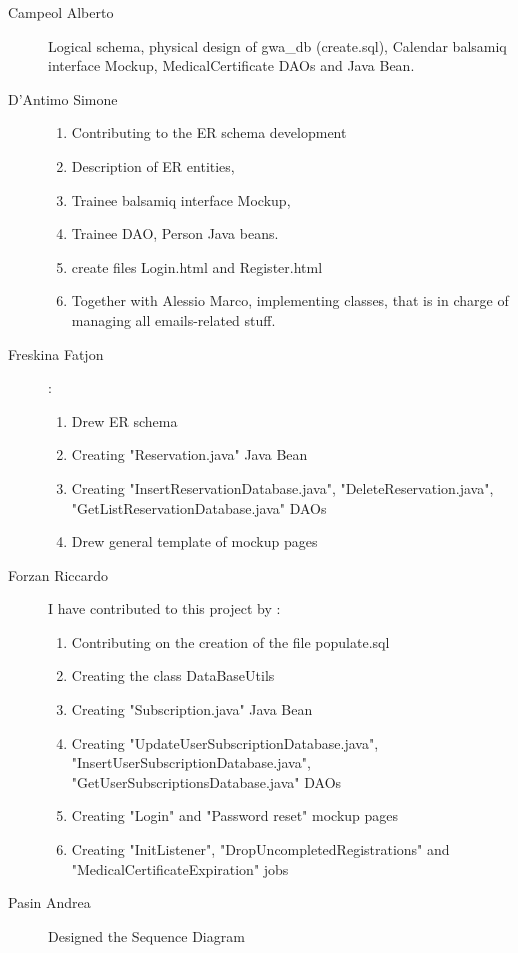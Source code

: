 \begin{description}
	\item[Campeol Alberto] Logical schema, physical design of gwa\_db (create.sql), Calendar balsamiq interface Mockup, MedicalCertificate DAOs and Java Bean.
	\item[D'Antimo Simone] 
	\begin{enumerate}
		\item Contributing to the ER schema development
		\item Description of ER entities,
		\item Trainee balsamiq interface Mockup,
		\item Trainee DAO, Person Java beans.
		\item create files Login.html and Register.html  
		\item Together with Alessio Marco, implementing classes, that is in charge of managing all emails-related stuff.
	\end{enumerate}
	\item[Freskina Fatjon] :
	\begin{enumerate}
		\item Drew ER schema 
		\item Creating "Reservation.java" Java Bean 
		\item Creating "InsertReservationDatabase.java", "DeleteReservation.java", "GetListReservationDatabase.java" DAOs
		\item Drew general template of mockup pages 
	\end{enumerate} 
	
	\item[Forzan Riccardo] I have contributed to this project by :
	\begin{enumerate}
		\item Contributing on the creation of the file populate.sql
		\item Creating the class DataBaseUtils
		\item Creating "Subscription.java" Java Bean
		\item Creating "UpdateUserSubscriptionDatabase.java", "InsertUserSubscriptionDatabase.java", "GetUserSubscriptionsDatabase.java" DAOs
		\item Creating "Login" and "Password reset" mockup pages
		\item Creating "InitListener", "DropUncompletedRegistrations" and "MedicalCertificateExpiration" jobs
	\end{enumerate}
	
	\item[Pasin Andrea] 
	Designed the Sequence Diagram
	

\end{description}
